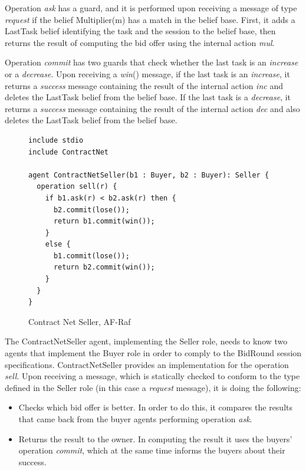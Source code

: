 \documentclass[a4paper,12pt,oneside,fleqn]{book} %
\begin{document}
Operation \textit{ask} has a guard, and it is performed upon receiving a
message of type \textit{request} if the belief Multiplier(m) has a match in
the belief base. First, it adds a LastTask belief identifying the task and
the session to the belief base, then returns the result of computing the
bid offer using the internal action \textit{mul}.

Operation \textit{commit} has two guards that check whether the last task is
an \textit{increase} or a \textit{decrease}. Upon receiving a
\textit{win}() message, if the last task is an \textit{increase}, it returns
a \textit{success} message containing the result of the internal action
\textit{inc} and deletes the LastTask belief from the belief base. If the last
task is a \textit{decrease}, it returns a \textit{success} message
containing the result of the internal action \textit{dec} and also deletes
the LastTask belief from the belief base.

\begin{figure}\footnotesize %
\begin{verbatim}
include stdio
include ContractNet

agent ContractNetSeller(b1 : Buyer, b2 : Buyer): Seller {
  operation sell(r) {
    if b1.ask(r) < b2.ask(r) then {
      b2.commit(lose());
      return b1.commit(win());
    }
    else {
      b1.commit(lose());
      return b2.commit(win());
    }
  }
}
\end{verbatim}
\caption{Contract Net Seller, AF-Raf}
\label{fig:contract-seller}
\end{figure} %

The ContractNetSeller agent, implementing the Seller role, needs to know
two agents that implement the Buyer role in order to comply to the BidRound
session specifications. ContractNetSeller provides an implementation for
the operation \textit{sell}. Upon receiving a message, which is statically
checked to conform to the type defined in the Seller role (in this case a
\textit{request} message), it is doing the following:

\begin{itemize}
\item Checks which bid offer is better. In order to do this, it compares the
results that came back from the buyer agents performing operation
\textit{ask}.
\item Returns the result to the owner. In computing the result it uses the
buyers' operation \textit{commit}, which at the same time informs the
buyers about their success.
\end{itemize}
\end{document}
